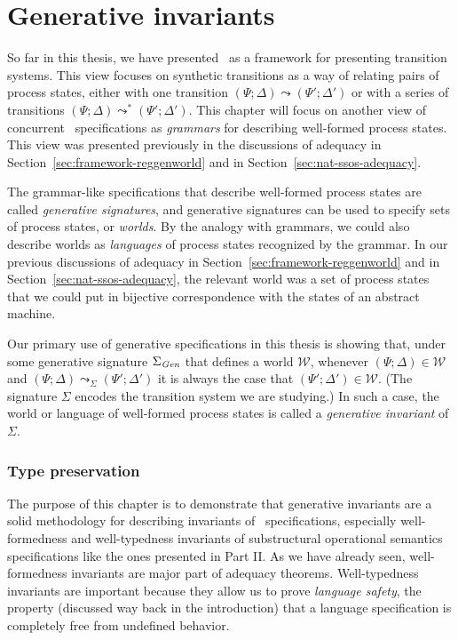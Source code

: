 \chapter{Generative invariants}
\label{chapter-gen}

So far in this thesis, we have presented \sls~as a framework for
presenting transition systems. This view focuses on synthetic
transitions as a way of relating pairs of process states, either with
one transition $(\Psi; \Delta) \leadsto (\Psi'; \Delta')$ or with a
series of transitions $(\Psi; \Delta) \leadsto^* (\Psi';
\Delta')$. This chapter will focus on another view of concurrent
\sls~specifications as {\it grammars} for describing well-formed
process states. This view was presented previously in the discussions
of adequacy in Section~\ref{sec:framework-reggenworld} and in
Section~\ref{sec:nat-ssos-adequacy}.

The grammar-like specifications that describe well-formed process
states are called {\it generative signatures}, and generative
signatures can be used to specify sets of process states, or {\it
  worlds}. By the analogy with grammars, we could also describe worlds
as {\it languages} of process states recognized by the grammar. In our
previous discussions of adequacy in
Section~\ref{sec:framework-reggenworld} and in
Section~\ref{sec:nat-ssos-adequacy}, the relevant world was a set of
process states that we could put in bijective correspondence with the
states of an abstract machine.

Our primary use of generative specifications in this thesis is showing
that, under some generative signature $\Sigma_{\it Gen}$ that defines
a world $\mathcal W$, whenever $(\Psi; \Delta) \in \mathcal W$ and
$(\Psi; \Delta) \leadsto_\Sigma (\Psi'; \Delta')$ it is always the
case that $(\Psi'; \Delta') \in \mathcal W$.  (The signature $\Sigma$
encodes the transition system we are studying.)  In such a case, the
world or language of well-formed process states is called a {\it
  generative invariant} of $\Sigma$.

\subsection*{Type preservation}

The purpose of this chapter is to demonstrate that generative
invariants are a solid methodology for describing invariants of
\sls~specifications, especially well-formedness and well-typedness
invariants of substructural operational semantics specifications like
the ones presented in Part II. As we have already
seen, well-formedness invariants are major part of adequacy
theorems. Well-typedness invariants are important because they allow us to
prove {\it language safety}, the property (discussed way back in the
introduction) that a language specification is completely free
from undefined behavior.


